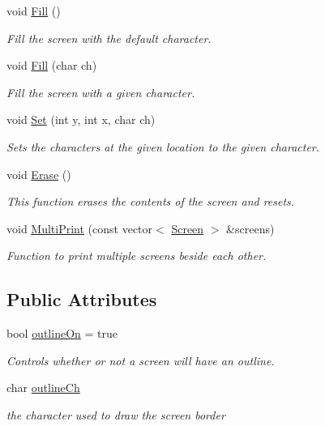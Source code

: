 \begin{DoxyCompactItemize}
void \hyperlink{classScreen_a8cf89892a333f7d6e7227ffdf77b3351}{Fill} ()
\begin{DoxyCompactList}\small\item\em Fill the screen with the default character. \end{DoxyCompactList}\item 
void \hyperlink{classScreen_aeeebb297b5f39c2b25ee026df8fec9ac}{Fill} (char ch)
\begin{DoxyCompactList}\small\item\em Fill the screen with a given character. \end{DoxyCompactList}\item 
void \hyperlink{classScreen_ab035671163a5cabee7611c7c456b1c56}{Set} (int y, int x, char ch)
\begin{DoxyCompactList}\small\item\em Sets the characters at the given location to the given character. \end{DoxyCompactList}\item 
void \hyperlink{classScreen_a7e2c21a6e63390eb3d8b46ee85af05d2}{Erase} ()
\begin{DoxyCompactList}\small\item\em This function erases the contents of the screen and resets. \end{DoxyCompactList}\item 
void \hyperlink{classScreen_af2db1ce1cd4beb8fec5f022bfbeb0c31}{Multi\-Print} (const vector$<$ \hyperlink{classScreen}{Screen} $>$ \&screens)
\begin{DoxyCompactList}\small\item\em Function to print multiple screens beside each other. \end{DoxyCompactList}\end{DoxyCompactItemize}
\subsection*{Public Attributes}
\begin{DoxyCompactItemize}
\item 
bool \hyperlink{classScreen_a6f906b745f406576d9f7aeaec330c9d6}{outline\-On} = true
\begin{DoxyCompactList}\small\item\em Controls whether or not a screen will have an outline. \end{DoxyCompactList}\item 
char \hyperlink{classScreen_a0b59df2bfafff7a121286a5ea40503b6}{outline\-Ch}
\begin{DoxyCompactList}\small\item\em the character used to draw the screen border \end{DoxyCompactList}\end{DoxyCompactItemize}
